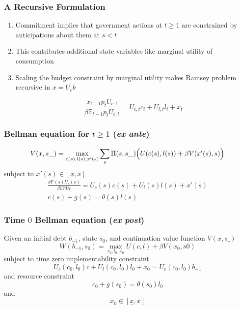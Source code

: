 \documentclass{beamer}
\newcommand{\EE}{\mathbb E}
\begin{document}
 \begin{frame}
	\frametitle{A Recursive Formulation}
	
	\begin{enumerate}
	 \item Commitment implies that government actions at $t \geq 1$ are constrained by  anticipations about them at $s < t$
	 \item This contributes additional state variables like marginal utility of consumption
	 \item Scaling the budget constraint by marginal utility makes Ramsey problem  recursive in  $x=U_c b$
	
	\[
		\frac{x_{t-1} p_t U_{c,t}}{\beta \EE_{t-1} p_t U_{c,t}}  = U_{c,t}c_t+U_{l,t} l_t + x_t
	\]
	
	\end{enumerate}
	
	
	\end{frame}
	\begin{frame}
	\frametitle{Bellman equation for $t\geq1$ (\textit{ex ante})}
	\[
		V(x,s\_) = \max_{c(s),l(s),x'(s)} \sum_s \Pi(s,s\_)\Bigl(U(c(s),l(s)) + \beta V(x'(s),s)\Bigr)
	\]subject to $x'(s)\in [\underline x,\overline x]$
	\begin{align*}
		\frac{x \mathbb{P}(s) U_c(s)}{\beta\EE \mathbb{P}Uc} =U_c(s)c(s)+U_l(s)l(s) + x'(s)\\
		c(s) + g(s) = \theta(s)l(s)
	\end{align*}
	
 \end{frame}
\begin{frame}
	\frametitle{Time $0$ Bellman equation (\textit{ex post})}
	Given an initial  debt $b_{-1}$, state $s_0$,  and continuation value function $V(x,s\_)$
	\[
		W(b_{-1},s_0) = \max_{c_{0},l_0,x_{0}} U(c,l) +\beta V(x_0,s0)
	\]subject to  time zero implementability constraint
	\[
		U_{c}(c_0,l_0)c + U_l(c_0,l_0) l_0 + x_0 = U_c(c_0,l_0) b_{-1}
	\]and  resource constraint
	\[
		c_0+ g(s_0) = \theta(s_0) l_0
	\]and
	\[
		x_0 \in [\underline x,\overline x]
	\]
\end{frame}
\end{document}
